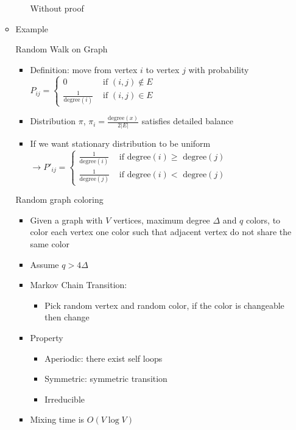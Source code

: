 \documentclass[a4paper]{article}
\begin{document}
\begin{itemize}
\begin{itemize}
\begin{itemize}
                        Without proof
                \end{itemize}
            \item Example

                Random Walk on Graph
                \begin{itemize}
                    \item Definition: move from vertex $i$ to vertex $j$ with probability $P_{ij} = \left\{ \begin{array}{cc} 0 & \text{ if $(i, j) \not \in E$ } \\ \frac{1}{\text{degree}(i)} & \text{ if $(i, j) \in E$ } \end{array} \right.$
                    \item Distribution $\pi$, $\pi_i = \frac{\text{degree}(x)}{2 |E|}$ satisfies detailed balance
                    \item If we want stationary distribution to be uniform $\rightarrow P'_{ij} = \left\{ \begin{array}{cc} \frac{1}{\text{degree}(i)} & \text{ if degree$(i) \geq$ degree$(j)$ } \\ \frac{1}{\text{degree}(j)} & \text{ if degree$(i) < $ degree$(j)$ } \end{array} \right.$
                \end{itemize}
                Random graph coloring
                \begin{itemize}
                    \item Given a graph with $V$ vertices, maximum degree $\Delta$ and $q$ colors, to color each vertex one color such that adjacent vertex do not share the same color
                    \item Assume $q > 4 \Delta$
                    \item Markov Chain Transition:
                        \begin{itemize}
                            \item Pick random vertex and random color, if the color is changeable then change
                        \end{itemize}
                    \item Property
                        \begin{itemize}
                            \item Aperiodic: there exist self loops
                            \item Symmetric: symmetric transition
                            \item Irreducible
                        \end{itemize}
                    \item Mixing time is $O(V \log V)$


\end{itemize}
\end{itemize}
\end{itemize}
\end{document}
